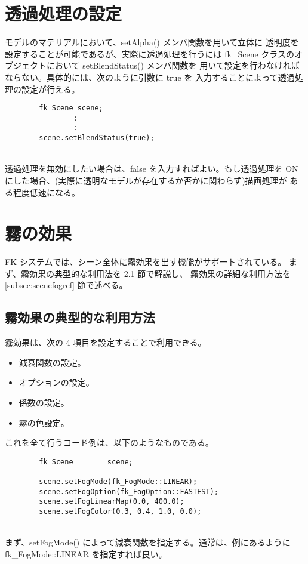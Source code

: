 \section{透過処理の設定} \label{sec:scenetrans}
モデルのマテリアルにおいて、setAlpha() メンバ関数を用いて立体に
透明度を設定することが可能であるが、実際に透過処理を行うには
fk\_Scene クラスのオブジェクトにおいて setBlendStatus() メンバ関数を
用いて設定を行わなければならない。具体的には、次のように引数に true を
入力することによって透過処理の設定が行える。
\\
\begin{screen}
\begin{verbatim}
        fk_Scene scene;
                :
                :
        scene.setBlendStatus(true);
\end{verbatim}
\end{screen}
~ \\
透過処理を無効にしたい場合は、false を入力すればよい。もし透過処理を
ON にした場合、(実際に透明なモデルが存在するか否かに関わらず)描画処理が
ある程度低速になる。

\section{霧の効果}
FK システムでは、シーン全体に霧効果を出す機能がサポートされている。
まず、霧効果の典型的な利用法を \ref{subsec:scenefogintro} 節で解説し、
霧効果の詳細な利用方法を \ref{subsec:scenefogref} 節で述べる。

\subsection{霧効果の典型的な利用方法} \label{subsec:scenefogintro}
霧効果は、次の 4 項目を設定することで利用できる。
\begin{itemize}
 \item 減衰関数の設定。
 \item オプションの設定。
 \item 係数の設定。
 \item 霧の色設定。
\end{itemize}
これを全て行うコード例は、以下のようなものである。
\\
\begin{breakbox}
\begin{verbatim}
        fk_Scene        scene;

        scene.setFogMode(fk_FogMode::LINEAR);
        scene.setFogOption(fk_FogOption::FASTEST);
        scene.setFogLinearMap(0.0, 400.0);
        scene.setFogColor(0.3, 0.4, 1.0, 0.0);
\end{verbatim}
\end{breakbox}
~ \\
まず、setFogMode() によって減衰関数を指定する。通常は、例にあるように
fk\_FogMode::LINEAR を指定すれば良い。

